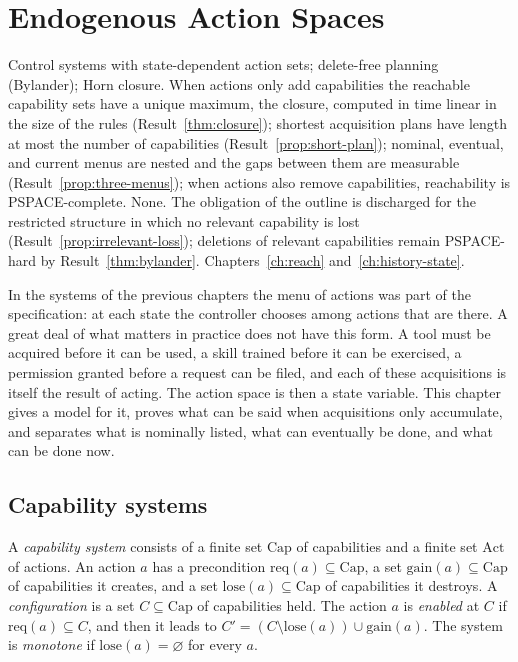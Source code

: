 \chapter{Endogenous Action Spaces}\label{ch:endogenous}
{Control systems with state-dependent action sets; delete-free planning (Bylander); Horn closure.}
{When actions only add capabilities the reachable capability sets have a unique maximum, the closure, computed in time linear in the size of the rules (Result~\ref{thm:closure}); shortest acquisition plans have length at most the number of capabilities (Result~\ref{prop:short-plan}); nominal, eventual, and current menus are nested and the gaps between them are measurable (Result~\ref{prop:three-menus}); when actions also remove capabilities, reachability is PSPACE-complete.}
{None. The obligation of the outline is discharged for the restricted structure in which no relevant capability is lost (Result~\ref{prop:irrelevant-loss}); deletions of relevant capabilities remain PSPACE-hard by Result~\ref{thm:bylander}.}
{Chapters~\ref{ch:reach} and~\ref{ch:history-state}.}

In the systems of the previous chapters the menu of actions was part of the specification: at each state the controller chooses among actions that are there. A great deal of what matters in practice does not have this form. A tool must be acquired before it can be used, a skill trained before it can be exercised, a permission granted before a request can be filed, and each of these acquisitions is itself the result of acting. The action space is then a state variable. This chapter gives a model for it, proves what can be said when acquisitions only accumulate, and separates what is nominally listed, what can eventually be done, and what can be done now.

\section{Capability systems}

\begin{definition}\label{def:capsys}
A \emph{capability system} consists of a finite set $\mathrm{Cap}$ of capabilities and a finite set $\mathrm{Act}$ of actions. An action $a$ has a precondition $\mathrm{req}(a)\subseteq\mathrm{Cap}$, a set $\mathrm{gain}(a)\subseteq\mathrm{Cap}$ of capabilities it creates, and a set $\mathrm{lose}(a)\subseteq\mathrm{Cap}$ of capabilities it destroys. A \emph{configuration} is a set $C\subseteq\mathrm{Cap}$ of capabilities held. The action $a$ is \emph{enabled} at $C$ if $\mathrm{req}(a)\subseteq C$, and then it leads to $C'=(C\setminus\mathrm{lose}(a))\cup\mathrm{gain}(a)$. The system is \emph{monotone} if $\mathrm{lose}(a)=\varnothing$ for every $a$.
\end{definition}

